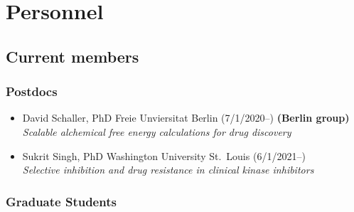 \documentclass[10pt]{article}
\begin{document}
\eject


\section*{Personnel}

\subsection*{Current members}

\subsubsection*{Postdocs}

\begin{itemize}
  \item David Schaller, PhD Freie Unviersitat Berlin (7/1/2020--) {\bf (Berlin group)}\\
  \emph{Scalable alchemical free energy calculations for drug discovery}

  \item Sukrit Singh, PhD Washington University St.\ Louis (6/1/2021--) \\
  \emph{Selective inhibition and drug resistance in clinical kinase inhibitors}

\end{itemize}

\subsubsection*{Graduate Students}
\end{document}
